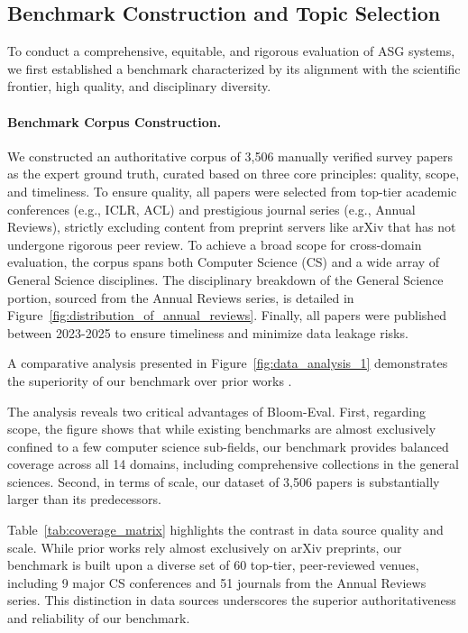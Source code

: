 \documentclass[11pt]{article}
\begin{document}
\subsection{Benchmark Construction and Topic Selection}
\label{sec:bench_topic}
To conduct a comprehensive, equitable, and rigorous evaluation of ASG systems, we first established a benchmark characterized by its alignment with the scientific frontier, high quality, and disciplinary diversity.

\paragraph{Benchmark Corpus Construction.}
We constructed an authoritative corpus of 3,506 manually verified survey papers as the expert ground truth, curated based on three core principles: quality, scope, and timeliness. To ensure quality, all papers were selected from top-tier academic conferences (e.g., ICLR, ACL) and prestigious journal series (e.g., Annual Reviews), strictly excluding content from preprint servers like arXiv that has not undergone rigorous peer review. To achieve a broad scope for cross-domain evaluation, the corpus spans both Computer Science (CS) and a wide array of General Science disciplines. The disciplinary breakdown of the General Science portion, sourced from the Annual Reviews series, is detailed in Figure~\ref{fig:distribution_of_annual_reviews}. Finally, all papers were published between 2023-2025 to ensure timeliness and minimize data leakage risks. 

A comparative analysis presented in Figure~\ref{fig:data_analysis_1} demonstrates the superiority of our benchmark over prior works \citep{wang2024autosurvey, yan2025surveyforge, liang2025surveyx, wang2025llmmapreducev2}. 

The analysis reveals two critical advantages of Bloom-Eval. First, regarding scope, the figure shows that while existing benchmarks are almost exclusively confined to a few computer science sub-fields, our benchmark provides balanced coverage across all 14 domains, including comprehensive collections in the general sciences. Second, in terms of scale, our dataset of 3,506 papers is substantially larger than its predecessors.

Table~\ref{tab:coverage_matrix} highlights the contrast in data source quality and scale. While prior works \citep{guo2025sgsimeval} rely almost exclusively on arXiv preprints, our benchmark is built upon a diverse set of 60 top-tier, peer-reviewed venues, including 9 major CS conferences and 51 journals from the Annual Reviews series. This distinction in data sources underscores the superior authoritativeness and reliability of our benchmark.
\end{document}
